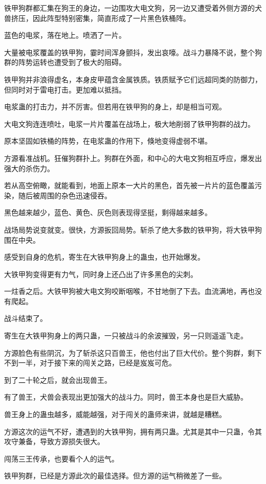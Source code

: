 \begin{this_body}
铁甲狗群都汇集在狗王的身边，一边围攻大电文狗，另一边又遭受着外侧方源的犬兽挤压，因此阵型特别密集，简直形成了一片黑色铁桶阵。

蓝色的电浆，落在地上。喷洒了一片。

大量被电浆覆盖的铁甲狗，霎时间浑身颤抖，发出哀嚎。战斗力暴降不说，整个狗群的阵势运转也遭受到了极大的阻碍。

铁甲狗并非浪得虚名，本身皮甲蕴含金属铁质。铁质赋予它们远超同类的防御力，但同时对于雷电打击。更加难以抵挡。

电浆蛊的打击力，并不厉害。但若用在铁甲狗的身上，却是相当可观。

大电文狗连连喷吐，电浆一片片覆盖在战场上，极大地削弱了铁甲狗群的战力。

原本坚固如铁桶的阵势，在电浆蛊的作用下，倏地变得虚弱不堪。

方源看准战机。狂催狗群扑上。狗群在外面，和中心的大电文狗相互呼应，爆发出强大的杀伤力。

若从高空俯瞰，就能看到，地面上原本一大片的黑色，首先被一片片的蓝色覆盖污染，随后被周围的杂色迅速侵吞。

黑色越来越少，蓝色、黄色、灰色则表现得坚挺，剩得越来越多。

战场局势说变就变。很快，方源扳回局势。斩杀了绝大多数的铁甲狗，将大铁甲狗围在中央。

感受到自身的危机，寄生在大铁甲狗身上的蛊虫，也开始爆发。

大铁甲狗变得更有力气，同时身上还凸出了许多黑色的尖刺。

一炷香之后。大铁甲狗被大电文狗咬断咽喉，不甘地倒了下去。血流满地，再也没有爬起。

战斗结束了。

寄生在大铁甲狗身上的两只蛊，一只被战斗的余波摧毁，另一只则遥遥飞走。

方源脸色有些阴沉，为了斩杀这只百兽王，他也付出了巨大代价。整个狗群，剩下不到一半，对于接下来的闯关之路，已经是岌岌可危。

到了二十轮之后，就会出现兽王。

有了兽王，犬兽会表现出更加强大的战斗力。同时，兽王本身也是巨大威胁。

兽王身上的蛊虫越多，威能越强，对于闯关的蛊师来讲，就越是糟糕。

方源这次的运气不好，遭遇到的大铁甲狗，拥有两只蛊。尤其是其中一只蛊，令其攻守兼备，导致方源损失很大。

闯荡三王传承，也要看个人的运气。

铁甲狗群，已经是方源此次的最佳选择。但方源的运气稍微差了一些。


\end{this_body}

